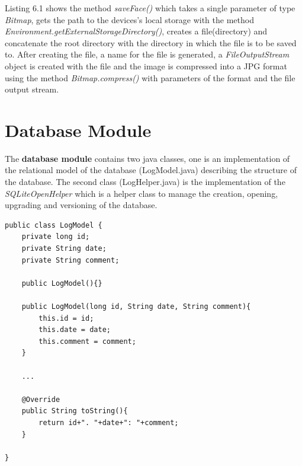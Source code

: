 Listing 6.1 shows the method {\it saveFace()} which takes a single parameter of type {\it Bitmap}, gets the path to the devices's local storage with the method {\it Environment.getExternalStorageDirectory()}, creates a file(directory) and concatenate the root directory with the directory in which the file is to be saved to. After creating the file, a name for the file is generated, a {\it FileOutputStream} object is created with the file and the image is compressed into a JPG format using the method {\it Bitmap.compress()} with parameters of the format and the file output stream.

\newpage
\section{Database Module}
The {\bf database module} contains two java classes, one is an implementation of the relational model of the database (LogModel.java) describing the structure of the database. The second class (LogHelper.java) is the implementation of the {\it SQLiteOpenHelper} which is a helper class to manage the creation, opening, upgrading and versioning of the database.  

\begin{lstlisting}[label=database-relational-model,caption=Relational Model of the Database Module]
public class LogModel {
	private long id;
	private String date;
	private String comment;
	
	public LogModel(){}
	
	public LogModel(long id, String date, String comment){
		this.id = id;
		this.date = date;
		this.comment = comment;		
	}
	
	...
	
	@Override
	public String toString(){
		return id+". "+date+": "+comment;
	}
	
}
\end{lstlisting}

